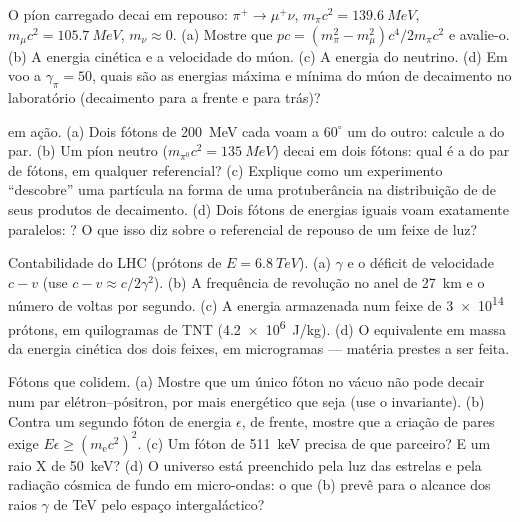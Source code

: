 \begin{exercise}[$\star\star$]\label{exo:b3:relativistic-dynamics:6}
O píon carregado decai em repouso: $\pi^+ \to \mu^+\nu$, $m_\pi c^2 =
\qty{139.6}{MeV}$, $m_\mu c^2 = \qty{105.7}{MeV}$, $m_\nu \approx 0$.
(a) Mostre que $pc = (m_\pi^2 - m_\mu^2)c^4/2m_\pi c^2$ e avalie-o.
(b) A energia cinética e a velocidade do múon. (c) A energia do
neutrino. (d) Em voo a $\gamma_\pi = 50$, quais são as energias máxima
e mínima do múon de decaimento no laboratório (decaimento para a frente
e para trás)?
\end{exercise}

\begin{exercise}[$\star\star$]\label{exo:b3:relativistic-dynamics:7}
 em ação. (a) Dois fótons de \qty{200}{MeV} cada voam
a $60^\circ$ um do outro: calcule a  do par.
(b) Um píon neutro ($m_{\pi^0}c^2 = \qty{135}{MeV}$) decai em dois
fótons: qual é a  do par de fótons, em qualquer
referencial? (c) Explique como um experimento ``descobre'' uma
partícula na forma de uma protuberância na distribuição de  de seus produtos de decaimento. (d) Dois fótons de energias
iguais voam exatamente paralelos: ? O que isso diz
sobre o referencial de repouso de um feixe de luz?
\end{exercise}

\begin{exercise}[$\star\star$]\label{exo:b3:relativistic-dynamics:8}
Contabilidade do LHC (prótons de $E = \qty{6.8}{TeV}$). (a) $\gamma$ e
o déficit de velocidade $c - v$ (use $c - v \approx c/2\gamma^2$). (b)
A frequência de revolução no anel de \qty{27}{km} e o número de voltas
por segundo. (c) A energia armazenada num feixe de \num{3e14} prótons,
em quilogramas de TNT (\qty{4.2e6}{J/kg}). (d) O equivalente em massa
da energia cinética dos dois feixes, em microgramas --- matéria prestes
a ser feita.
\end{exercise}

\begin{exercise}[$\star\star$]\label{exo:b3:relativistic-dynamics:9}
Fótons que colidem. (a) Mostre que um único fóton no vácuo não pode
decair num par elétron--pósitron, por mais energético que seja (use o
invariante). (b) Contra um segundo fóton de energia $\epsilon$, de
frente, mostre que a criação de pares exige
$E\epsilon \ge (m_{\text{e}}c^2)^2$. (c) Um fóton de \qty{511}{keV}
precisa de que parceiro? E um raio X de \qty{50}{keV}? (d) O universo
está preenchido pela luz das estrelas e pela radiação cósmica de fundo
em micro-ondas: o que (b) prevê para o alcance dos raios $\gamma$ de
TeV pelo espaço intergaláctico?
\end{exercise}

